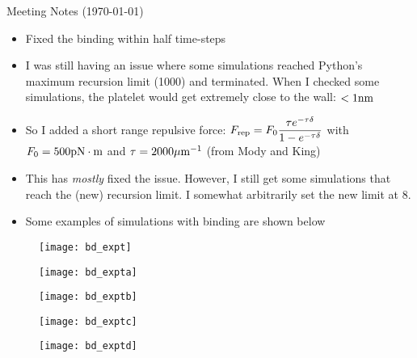 \documentclass{article}
\newcommand{\tn}{\textnormal}
\begin{document}
\pagestyle{plain}

\begin{center}
  {\Large Meeting Notes (\today)}
\end{center}

\begin{itemize}
\item Fixed the binding within half time-steps
\item I was still having an issue where some simulations reached
  Python's maximum recursion limit (1000) and terminated. When I
  checked some simulations, the platelet would get extremely close to
  the wall: $< 1 \tn{nm}$
\item So I added a short range repulsive force:
  $\displaystyle{F_\tn{rep} = F_0 \frac{\tau e^{-\tau \delta}}{1 -
      e^{-\tau \delta}}}$ with $F_0 = 500 \tn{pN} \cdot \tn{m}$ and
  $\tau = 2000 \mu\tn{m}^{-1}$ (from Mody and King)
\item This has \emph{mostly} fixed the issue. However, I still get
  some simulations that reach the (new) recursion limit. I somewhat
  arbitrarily set the new limit at 8.
\item Some examples of simulations with binding are shown below
\end{itemize}

\begin{figure}
  \centering
  \texttt{[image: bd\_expt]}
  \caption{}
  \label{fig:fig1}
\end{figure}

\begin{figure}
  \centering
  \texttt{[image: bd\_expta]}
  \caption{}
  \label{fig:fig2}
\end{figure}

\begin{figure}
  \centering
  \texttt{[image: bd\_exptb]}
  \caption{}
  \label{fig:fig3}
\end{figure}

\begin{figure}
  \centering
  \texttt{[image: bd\_exptc]}
  \caption{}
  \label{fig:fig4}
\end{figure}

\begin{figure}
  \centering
  \texttt{[image: bd\_exptd]}
  \caption{}
  \label{fig:fig5}
\end{figure}



\end{document}
